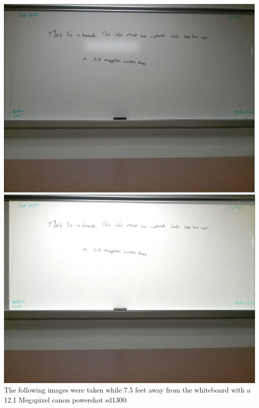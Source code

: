 \documentclass[]{article}
\begin{document}
		\includegraphics{images/UnmodifiedPhoneClose.jpg} \\
		\includegraphics{images/ModifiedPhoneClose.jpg} \\
		
		The following images were taken while 7.5 feet away from the whiteboard with a 12.1 Megapixel canon powershot sd1300:
		
\end{document}
